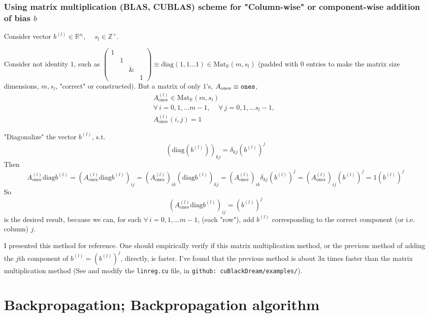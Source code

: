 \documentclass[10pt]{amsart}
\begin{document}
\begin{multicols*}{2}
\subsubsection{Using matrix multiplication (BLAS, CUBLAS) scheme for "Column-wise" or component-wise addition of bias $b$} 

Consider vector $b^{(l)} \in \mathbb{R}^{s_l}$, \  \  $s_l \in \mathbb{Z}^+$.  

Consider not identity $1$, such as $\left( \begin{matrix}1 & & & \\ & 1 & & \\ & & \ddot & \\ & & & 1 \end{matrix}\right) \equiv \text{diag}(1,1\dots 1) \in \text{Mat}_{\mathbb{R}}(m,s_l)$ (padded with $0$ entries to make the matrix size dimensions, $m,s_l$, "correct" or constructed).  But a matrix of only $1$'s, $A_{\text{ones}} \equiv \verb|ones|$,  
\[
\begin{gathered}
A^{(l)}_{\text{ones}} \in \text{Mat}_{\mathbb{R}}(m,s_l)  \\
\forall \, i =0,1,\dots m-1, \quad \, \forall \, j =0,1,\dots s_l-1 ,  \  \  \\
A^{(l)}_{\text{ones}}(i,j) =1
\end{gathered}
\]

"Diagonalize" the vector $b^{(l)}$, s.t.
\[
(\text{diag}(b^{(l)}))_{kj} = \delta_{kj} (b^{(l)})^j
\]
Then 
\[
A_{\text{ones}}^{(l)} \text{diag}b^{(l)} = (A_{\text{ones}}^{(l)} \text{diag}b^{(l)} )_{ij} = ( A_{\text{ones}}^{(l)})_{ik} (\text{diag}b^{(l)} )_{kj} = ( A_{\text{ones}}^{(l)})_{ik} \delta_{kj} (b^{(l)})^j = ( A_{\text{ones}}^{(l)})_{ij}  (b^{(l)})^j = 1(b^{(l)})^j
\]
So 
\[
(A_{\text{ones}}^{(l)} \text{diag}b^{(l)} )_{ij} = (b^{(l)})^j
\]
is the desired result, because we can, for each $\forall \, i =0,1,\dots m-1$, (each "row"), add $b^{(l)}$ corresponding to the correct component (or i.e. column) $j$.  

I presented this method for reference.  One should empirically verify if this matrix multiplication method, or the previous method of adding the $j$th component of $b^{(l)} = ( b^{(l)})^j$, directly, is faster.  I've found that the previous method is about 3x times faster than the matrix multiplication method (See and modify the \verb|linreg.cu| file, in \verb|github: cuBlackDream/examples/|).  



\section{Backpropagation; Backpropagation algorithm}


\end{multicols*}
\end{document}
